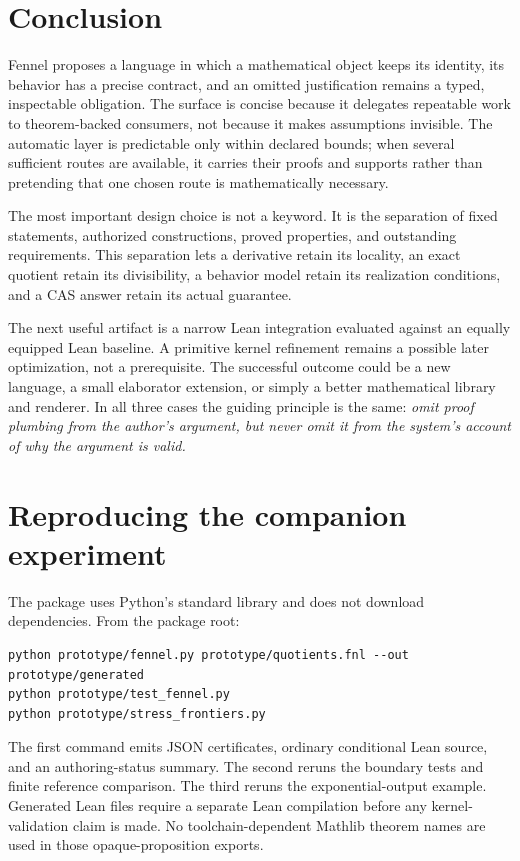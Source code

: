 \documentclass[11pt,a4paper]{article}
\theoremstyle{definition}
\theoremstyle{remark}
\begin{document}
\section{Conclusion}
Fennel proposes a language in which a mathematical object keeps its identity,
its behavior has a precise contract, and an omitted justification remains a
typed, inspectable obligation. The surface is concise because it delegates
repeatable work to theorem-backed consumers, not because it makes assumptions
invisible. The automatic layer is predictable only within declared bounds;
when several sufficient routes are available, it carries their proofs and
supports rather than pretending that one chosen route is mathematically
necessary.

The most important design choice is not a keyword. It is the separation of
fixed statements, authorized constructions, proved properties, and outstanding
requirements. This separation lets a derivative retain its locality, an exact
quotient retain its divisibility, a behavior model retain its realization
conditions, and a CAS answer retain its actual guarantee.

The next useful artifact is a narrow Lean integration evaluated against an
equally equipped Lean baseline. A primitive kernel refinement remains a
possible later optimization, not a prerequisite. The successful outcome could
be a new language, a small elaborator extension, or simply a better mathematical
library and renderer. In all three cases the guiding principle is the same:
\emph{omit proof plumbing from the author's argument, but never omit it from
the system's account of why the argument is valid.}

\appendix
\section{Reproducing the companion experiment}
The package uses Python's standard library and does not download dependencies.
From the package root:
\begin{lstlisting}
python prototype/fennel.py prototype/quotients.fnl --out prototype/generated
python prototype/test_fennel.py
python prototype/stress_frontiers.py
\end{lstlisting}
The first command emits JSON certificates, ordinary conditional Lean source,
and an authoring-status summary. The second reruns the boundary tests and
finite reference comparison. The third reruns the exponential-output example.
Generated Lean files require a separate Lean compilation before any
kernel-validation claim is made. No toolchain-dependent Mathlib theorem names
are used in those opaque-proposition exports.
\end{document}
